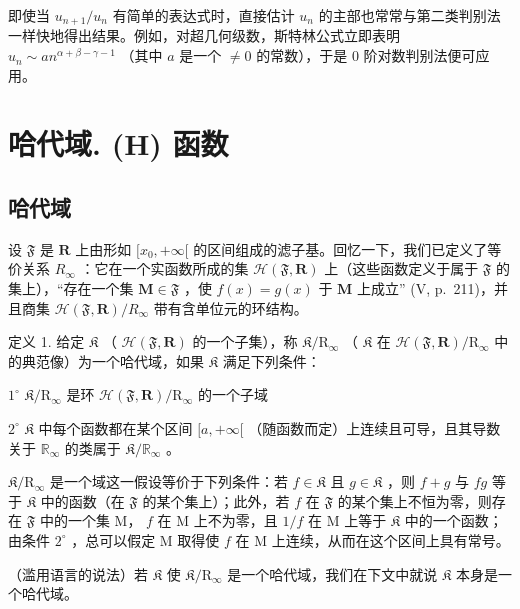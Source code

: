 即使当 \(u_{n+1} / u_n\) 有简单的表达式时，直接估计 \(u_n\) 的主部也常常与第二类判别法一样快地得出结果。例如，对超几何级数，斯特林公式立即表明 \(u_n \sim a n^{\alpha + \beta - \gamma - 1}\) （其中 \(a\) 是一个 \(\neq 0\) 的常数），于是 0 阶对数判别法便可应用。

\appendix
\renewcommand{\thechapter}{}
\renewcommand{\thesection}{\arabic{section}}
\chapter{哈代域. (H) 函数}

\section{哈代域}

设 \(\mathfrak{F}\) 是 \(\mathbf{R}\) 上由形如 \([x_0, +\infty[\) 的区间组成的滤子基。回忆一下，我们已定义了等价关系 \(R_{\infty}\) ：它在一个实函数所成的集 \(\mathcal{H}(\mathfrak{F}, \mathbf{R})\) 上（这些函数定义于属于 \(\mathfrak{F}\) 的集上），“存在一个集 \(\mathbf{M} \in \mathfrak{F}\) ，使 \(f(x) = g(x)\) 于 \(\mathbf{M}\) 上成立” (V, p.~211)，并且商集 \(\mathcal{H}(\mathfrak{F}, \mathbf{R}) / R_{\infty}\) 带有含单位元的环结构。

定义 1. 给定 \(\mathfrak{K}\) （ \(\mathcal{H}(\mathfrak{F},\mathbf{R})\) 的一个子集），称 \(\mathfrak{K}/\mathrm{R}_{\infty}\) （ \(\mathfrak{K}\) 在 \(\mathcal{H}(\mathfrak{F},\mathbf{R})/\mathrm{R}_{\infty}\) 中的典范像）为一个哈代域，如果 \(\mathfrak{K}\) 满足下列条件：

\(1^{\circ}\) \(\mathfrak{K} / \mathrm{R}_{\infty}\) 是环 \(\mathcal{H}(\mathfrak{F},\mathbf{R}) / \mathrm{R}_{\infty}\) 的一个子域

\(2^{\circ}\) \(\mathfrak{K}\) 中每个函数都在某个区间 \([a, +\infty[\) （随函数而定）上连续且可导，且其导数关于 \(\mathbb{R}_{\infty}\) 的类属于 \(\mathfrak{K}/\mathbb{R}_{\infty}\) 。

\(\mathfrak{K} / \mathrm{R}_{\infty}\) 是一个域这一假设等价于下列条件：若 \(f\in \mathfrak{K}\) 且 \(g\in \mathfrak{K}\) ，则 \(f + g\) 与 \(fg\) 等于 \(\mathfrak{K}\) 中的函数（在 \(\mathfrak{F}\) 的某个集上）；此外，若 \(f\) 在 \(\mathfrak{F}\) 的某个集上不恒为零，则存在 \(\mathfrak{F}\) 中的一个集 M， \(f\) 在 M 上不为零，且 \(1 / f\) 在 M 上等于 \(\mathfrak{K}\) 中的一个函数；由条件 \(2^{\circ}\) ，总可以假定 M 取得使 \(f\) 在 M 上连续，从而在这个区间上具有常号。

（滥用语言的说法）若 \(\mathfrak{K}\) 使 \(\mathfrak{K} / \mathrm{R}_{\infty}\) 是一个哈代域，我们在下文中就说 \(\mathfrak{K}\) 本身是一个哈代域。

